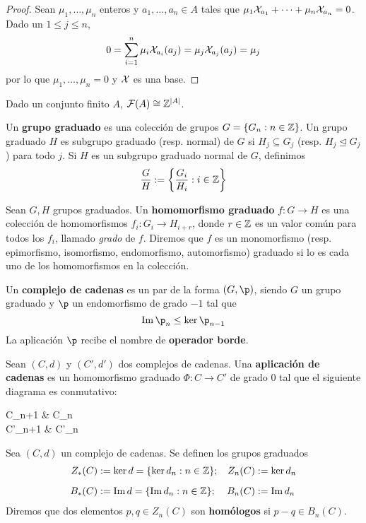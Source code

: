 \begin{proposition}
\begin{proof}
	Sean $\mu_1,\dots,\mu_n$ enteros y $a_1,\dots,a_n \in A$ tales que $\mu_1\mathcal{X}_{a_1}+\dots+\mu_n\mathcal{X}_{a_n}=0$.
	Dado un $1 \leq j \leq n$,
		\[0=\sum^n_{i=1}\mu_i\mathcal{X}_{a_i}(a_j)=\mu_j\mathcal{X}_{a_j}(a_j)=\mu_j\]
	por lo que $\mu_1,\dots,\mu_n=0$ y $\mathcal{X}$ es una base.
\end{proof}

\begin{remark}
	Dado un conjunto finito $A$, $\mathcal{F}(A)\cong \mathbb{Z}^{|A|}$.
\end{remark}

\begin{definition}
	Un \textbf{grupo graduado} es una colección de grupos $G=\{G_n: n \in \mathbb{Z}\}$.
	Un grupo graduado $H$ es subgrupo graduado (resp. normal) de $G$ si $H_j \subseteq G_j$ (resp. $H_j \trianglelefteq G_j$) para todo $j$.
	Si $H$ es un subgrupo graduado normal de $G$, definimos
		\[\frac{G}{H}:=\left\{\frac{G_i}{H_i}: i \in \mathbb{Z}\right\}\]
\end{definition}

Sean $G,H$ grupos graduados.
Un \textbf{homomorfismo graduado} $f\colon G \to H$ es una colección de homomorfismos $f_i\colon G_i \to H_{i+r}$, donde $r \in \mathbb{Z}$ es un valor común para todos los $f_i$, llamado \emph{grado} de $f$.
Diremos que $f$ es un monomorfismo (resp. epimorfismo, isomorfismo, endomorfismo, automorfismo) graduado si lo es cada uno de los homomorfismos en la colección.

\begin{definition}
	Un \textbf{complejo de cadenas} es un par de la forma $(G,\p)$, siendo $G$ un grupo graduado y $\p$ un endomorfismo de grado $-1$ tal que
		\[\im  \p_n \leq \ker \p_{n-1}\]
	La aplicación $\p$ recibe el nombre de \textbf{operador borde}.
\end{definition}

\begin{definition}
Sean $(C,d)$ y $(C',d')$ dos complejos de cadenas.
Una \textbf{aplicación de cadenas} es un homomorfismo graduado $\Phi\colon C \to C'$ de grado $0$ tal que el siguiente diagrama es conmutativo:
	\begin{diagram*}
	C_{n+1}   & C_n  \\
	C'_{n+1}                      & C'_n                   
	\end{diagram*}
\end{definition}

Sea $(C,d)$ un complejo de cadenas.
Se definen los grupos graduados
	\begin{align*}
		Z_*(C)&:=\ker d=\{\ker d_n: n \in \mathbb{Z}\};	& Z_n(C)&:=\ker d_n\\[0.2cm]
		B_*(C)&:=\operatorname{Im} d=\{\operatorname{Im} d_n: n \in \mathbb{Z}\}; 	& B_n(C)&:=\operatorname{Im} d_n
	\end{align*}
Diremos que dos elementos $p,q \in Z_n(C)$ son \textbf{homólogos} si $p-q \in B_n(C)$.


\end{proposition}
